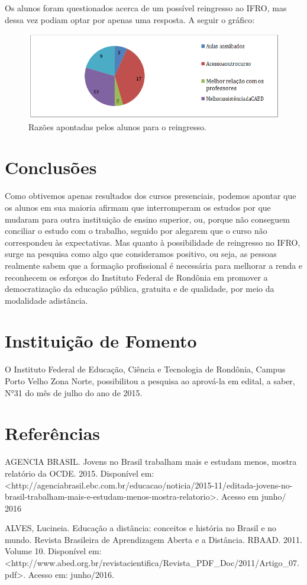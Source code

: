 \documentclass[article,12pt,onesidea,4paper,english,brazil]{abntex2}
\begin{document}
Os alunos foram questionados acerca de um possível reingresso ao IFRO, mas dessa vez podiam optar por apenas uma resposta. A seguir o gráfico:
\begin{figure}[h]
	\centering
	\includegraphics[width=0.7\linewidth]{pip-pg78-05}
	\caption{Razões apontadas pelos alunos para o reingresso.}
	\label{fig:pip-pg78-05}
\end{figure}	
	\section*{Conclusões}
	
Como obtivemos apenas resultados dos cursos presenciais, podemos apontar que os alunos em sua maioria afirmam que interromperam os estudos por que mudaram para outra instituição de ensino superior, ou, porque não conseguem conciliar o estudo com o trabalho, seguido por alegarem que o curso não correspondeu	às	expectativas.	Mas	quanto à possibilidade de reingresso no IFRO, surge na pesquisa como algo que consideramos positivo, ou seja, as pessoas realmente sabem que a formação profissional é necessária para melhorar a renda e reconhecem os esforços do Instituto Federal de Rondônia em promover a democratização da educação pública, gratuita e de qualidade, por meio da modalidade adistância.
	
	\section*{Instituição de Fomento}
	
	O Instituto Federal de Educação, Ciência e Tecnologia de Rondônia, Campus Porto Velho Zona Norte, possibilitou a pesquisa ao aprová-la em edital, a saber, N°31 do mês de julho do ano de 2015.
	
	
	
	\section*{Referências}
	
\noindent AGENCIA BRASIL. Jovens no Brasil trabalham mais e estudam menos, mostra relatório	da	OCDE.	2015.	Disponível	em:
<http://agenciabrasil.ebc.com.br/educacao/noticia/2015-11/editada-jovens-no-brasil-trabalham-mais-e-estudam-menos-mostra-relatorio>. Acesso em junho/ 2016

\noindent ALVES, Lucineia. Educação a distância: conceitos e história no Brasil e no mundo. Revista Brasileira de Aprendizagem Aberta e a Distância. RBAAD. 2011. Volume	10.	Disponível	em:
<http://www.abed.org.br/revistacientifica/Revista\_PDF\_Doc/2011/Artigo\_07.pdf>. Acesso em: junho/2016.

	
\end{document}
